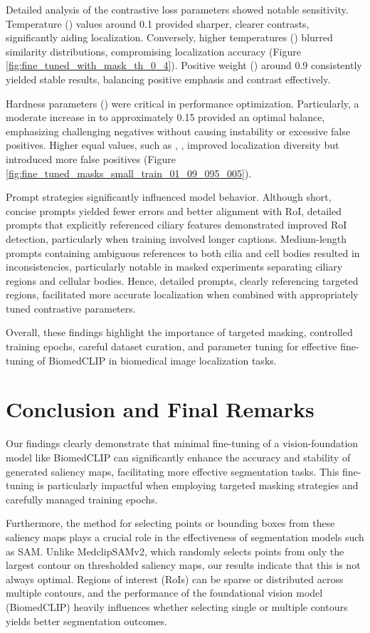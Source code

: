 \documentclass[./dissertation.tex]{subfiles}
\begin{document}
Detailed analysis of the contrastive loss parameters showed notable sensitivity. Temperature () values around 0.1 provided sharper, clearer contrasts, significantly aiding localization. Conversely, higher temperatures () blurred similarity distributions, compromising localization accuracy (Figure \ref{fig:fine_tuned_with_mask_th_0_4}). Positive weight () around 0.9 consistently yielded stable results, balancing positive emphasis and contrast effectively.

Hardness parameters () were critical in performance optimization. Particularly, a moderate increase in  to approximately 0.15 provided an optimal balance, emphasizing challenging negatives without causing instability or excessive false positives. Higher equal values, such as , , improved localization diversity but introduced more false positives (Figure \ref{fig:fine_tuned_masks_small_train_01_09_095_005}).

Prompt strategies significantly influenced model behavior. Although short, concise prompts yielded fewer errors and better alignment with RoI, detailed prompts that explicitly referenced ciliary features demonstrated improved RoI detection, particularly when training involved longer captions. Medium-length prompts containing ambiguous references to both cilia and cell bodies resulted in inconsistencies, particularly notable in masked experiments separating ciliary regions and cellular bodies. Hence, detailed prompts, clearly referencing targeted regions, facilitated more accurate localization when combined with appropriately tuned contrastive parameters.

Overall, these findings highlight the importance of targeted masking, controlled training epochs, careful dataset curation, and parameter tuning for effective fine-tuning of BiomedCLIP in biomedical image localization tasks.

\section{Conclusion and Final Remarks}

Our findings clearly demonstrate that minimal fine-tuning of a vision-foundation model like BiomedCLIP can significantly enhance the accuracy and stability of generated saliency maps, facilitating more effective segmentation tasks. This fine-tuning is particularly impactful when employing targeted masking strategies and carefully managed training epochs.

Furthermore, the method for selecting points or bounding boxes from these saliency maps plays a crucial role in the effectiveness of segmentation models such as SAM. Unlike MedclipSAMv2, which randomly selects points from only the largest contour on thresholded saliency maps, our results indicate that this is not always optimal. Regions of interest (RoIs) can be sparse or distributed across multiple contours, and the performance of the foundational vision model (BiomedCLIP) heavily influences whether selecting single or multiple contours yields better segmentation outcomes.
\end{document}
